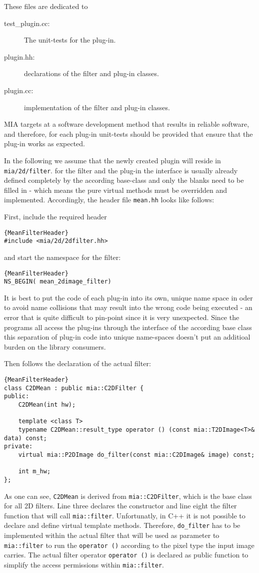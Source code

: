 \documentclass[english, 10pt, a4paper,headsepline,openany]{scrbook}
\begin{document}
These files are dedicated to 
\begin{description}
\item [test\_plugin.cc:] The unit-tests for the plug-in. 
\item [plugin.hh:] declarations of the filter and plug-in classes. 
\item [plugin.cc:] implementation of the filter and plug-in classes. 
\end{description}

MIA targets at a software development method that results in reliable software, and therefore,  
 for each plug-in unit-tests should be provided that ensure that the plug-in works as expected. 

In the following we assume that the newly created plugin will reside in \texttt{mia/2d/filter}. 
for the filter and the plug-in the interface is usually already defined completely by the according base-class
 and only the blanks need to be filled in - which means the pure virtual methods must be 
  overridden and implemented.
Accordingly, the header file \texttt{mean.hh} looks like follows: 

First, include the required header
\lstset{numbers=left,firstnumber=auto}
\begin{lstlisting}{MeanFilterHeader}
#include <mia/2d/2dfilter.hh>
\end{lstlisting}
and start the namespace for the filter: 
\begin{lstlisting}{MeanFilterHeader}
NS_BEGIN( mean_2dimage_filter)
\end{lstlisting}
It is best to put the code of each plug-in into its own, unique name space in oder to avoid 
  name collisions that may result into the wrong code being executed - an error that is quite 
  difficult to pin-point since it is very unexpected. 
Since the programs all access the plug-ins through the interface of the according base class this 
  separation of plug-in code into unique name-spaces doesn't put an additioal burden on the library consumers. 


Then follows the declaration of the actual filter: 
\begin{lstlisting}{MeanFilterHeader}
class C2DMean : public mia::C2DFilter {
public:
	C2DMean(int hw);

	template <class T>
	typename C2DMean::result_type operator () (const mia::T2DImage<T>& data) const;
private:
	virtual mia::P2DImage do_filter(const mia::C2DImage& image) const;

	int m_hw;
};
\end{lstlisting}
As one can see, \texttt{C2DMean} is derived from \texttt{mia::C2DFilter}, which is the base class 
  for all 2D filters.  
Line three declares the constructor and line eight the filter function that will call 
  \texttt{mia::filter}.
Unfortunatly, in C++ it is not possible to declare and define virtual template methods. 
Therefore, \texttt{do\_filter} has to be implemented within the actual filter that will 
  be used as parameter to \texttt{mia::filter} to run the \texttt{operator ()} according 
  to the pixel type the input image carries. 
The actual filter operator \texttt{operator ()} is declared as public function to simplify 
  the access permissions within \texttt{mia::filter}. 
\end{document}
